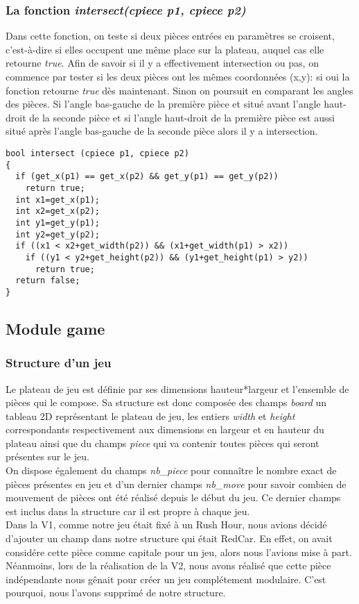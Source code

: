 \documentclass{report}
\begin{document}
\subsubsection*{La fonction \textit{intersect(cpiece p1, cpiece p2)}}
Dans cette fonction, on teste si deux pièces entrées en paramètres se croisent, c'est-à-dire si elles occupent une même place sur la plateau, auquel cas elle retourne \textit{true}. Afin de savoir si il y a effectivement intersection ou pas, on commence par tester si les deux pièces ont les mêmes coordonnées (x,y): si oui la fonction retourne \textit{true} dès maintenant. Sinon on poursuit en comparant les angles des pièces. Si l'angle bas-gauche de la première pièce et situé avant l'angle haut-droit de la seconde pièce et si l'angle haut-droit de la première pièce est aussi situé après l'angle bas-gauche de la seconde pièce alors il y a intersection.
\begin{lstlisting}
bool intersect (cpiece p1, cpiece p2)
{
  if (get_x(p1) == get_x(p2) && get_y(p1) == get_y(p2)) 
    return true;
  int x1=get_x(p1);
  int x2=get_x(p2);
  int y1=get_y(p1);
  int y2=get_y(p2);
  if ((x1 < x2+get_width(p2)) && (x1+get_width(p1) > x2))
    if ((y1 < y2+get_height(p2)) && (y1+get_height(p1) > y2))
      return true;
  return false;
}
\end{lstlisting}

\subsection{Module game}
\subsubsection{Structure d'un jeu}
Le plateau de jeu est définie par ses dimensions hauteur*largeur et l'ensemble de pièces qui le compose. Sa structure est donc composée des champs \textit{board} un tableau 2D représentant le plateau de jeu, les entiers \textit{width} et \textit{height} correspondants respectivement aux dimensions en largeur et en hauteur du plateau ainsi que du champs \textit{piece} qui va contenir toutes pièces qui seront présentes sur le jeu. \\
On dispose également du champs \textit{nb\_piece} pour connaître le nombre exact de pièces présentes en jeu et d'un dernier champs \textit{nb\_move} pour savoir combien de mouvement de pièces ont été réalisé depuis le début du jeu. Ce dernier champs est inclus dans la structure car il est propre à chaque jeu.\\
Dans la V1, comme notre jeu était fixé à un Rush Hour, nous avions décidé d'ajouter un champ dans notre structure qui était RedCar. En effet, on avait considére cette pièce comme capitale pour un jeu, alors nous l'avions mise à part. Néanmoins, lors de la réalisation de la V2, nous avons réalisé que cette pièce indépendante nous gênait pour créer un jeu complétement modulaire. C'est pourquoi, nous l'avons supprimé de notre structure.
\end{document}
